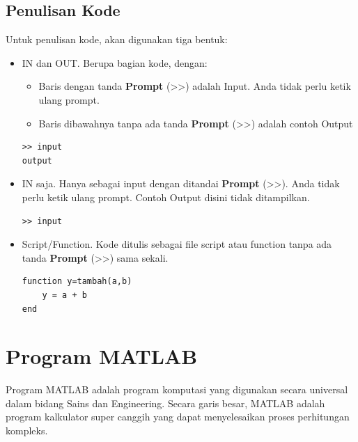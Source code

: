 \documentclass[12pt]{book}
\begin{document}
	\section{Penulisan Kode} 
	Untuk penulisan kode, akan digunakan tiga bentuk:
	\begin{itemize}
		\item IN dan OUT. Berupa bagian kode, dengan:
		\begin{itemize}
			\item Baris dengan tanda \textbf{Prompt} (>>) adalah Input.
			Anda tidak perlu ketik ulang prompt.
			\item Baris dibawahnya tanpa ada tanda \textbf{Prompt} (>>) adalah contoh Output
		\end{itemize}
	
		\begin{verbatim}
>> input
output
		\end{verbatim}
	
		\item IN saja. Hanya sebagai input dengan ditandai \textbf{Prompt} (>>).
		Anda tidak perlu ketik ulang prompt.
		Contoh Output disini tidak ditampilkan.
		
		\begin{verbatim}
>> input
		\end{verbatim}
	
		\item Script/Function. Kode ditulis sebagai file script atau function tanpa ada tanda \textbf{Prompt} (>>) sama sekali.
		
		\begin{verbatim}
function y=tambah(a,b)
	y = a + b
end
		\end{verbatim}
\end{itemize}
	
	
	\newpage
	\mainmatter
	\chapter{Program MATLAB}
	
	Program MATLAB adalah program komputasi yang digunakan secara universal dalam bidang Sains dan Engineering.
	Secara garis besar, MATLAB adalah program kalkulator super canggih yang dapat menyelesaikan proses perhitungan kompleks.
	
\end{document}
